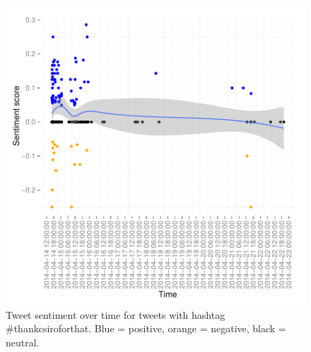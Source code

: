\documentclass[a4paper,10pt]{article}
\begin{document}
\begin{figure}[h]
\begin{center}
\includegraphics[scale=0.55]{thankCSIROjson-sentitime.pdf}
\caption{Tweet sentiment over time for tweets with hashtag \#thankcsiroforthat. Blue = positive, orange = negative, black = neutral.}
\end{center}
\end{figure}
\end{document}
